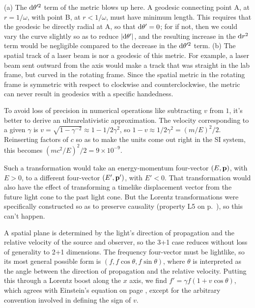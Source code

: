 
(a) The $\textup{d}\theta'^2$ term of the metric blows up here. A geodesic connecting point A, at $r=1/\omega$, with point B, at $r<1/\omega$,
must have minimum length. This requires that the geodesic be directly radial at A, so that $\textup{d}\theta'=0$; for if not, then we could
vary the curve slightly so as to reduce $|\textup{d}\theta'|$, and the resulting increase in the $\textup{d} r^2$ term would be negligible
compared to the decrease in the $\textup{d}\theta'^2$ term. (b) The spatial track of a laser beam is nor a geodesic of this metric.
For example, a laser beam sent outward from the axis would make a track that was straight in the lab frame, but curved in the
rotating frame. Since the spatial metric in the rotating frame is symmetric with respect to clockwise and counterclockwise,
the metric can never result in geodesics with a specific handedness.



To avoid loss of precision in numerical operations like subtracting $v$ from $1$,
it's better to derive an ultrarelativistic approximation. The velocity corresponding
to a given $\gamma$ is $v=\sqrt{1-\gamma^{-2}}\approx 1-1/2\gamma^2$, so
$1-v\approx 1/2\gamma^2=(m/E)^2/2$. Reinserting factors of $c$ so as to make the units
come out right in the SI system, this becomes $(mc^2/E)^2/2=9\times 10^{-9}$.


Such a transformation would take an energy-momentum four-vector $(E,\mathbf{p})$, with $E>0$, to
a different four-vector $(E',\mathbf{p}')$, with $E'<0$. That transformation would also have the
effect of transforming a timelike displacement vector from the future light cone to the past
light cone. But the Lorentz transformations were specifically constructed so as to preserve
causality (property L5 on p.~\pageref{sec:lorentz-geometry}), so this can't happen.


A spatial plane is determined by the light's direction of propagation and the relative velocity
of the source and observer, so the 3+1 case reduces without loss of generality to 2+1 dimensions.
The frequency four-vector must be lightlike, so its most general possible form is
$(f,f\cos\theta,f\sin\theta)$, where $\theta$ is interpreted as the angle between the direction of
propagation and the relative velocity. Putting this through a Lorentz boost along the $x$ axis,
we find $f'=\gamma f(1+v\cos\theta)$, which agrees with Einstein's equation on page
\pageref{einstein-doppler}, except for the arbitrary convention involved in defining the sign of $v$.

